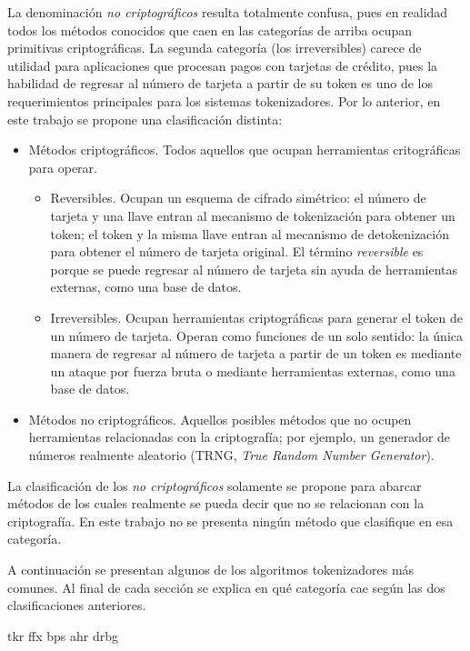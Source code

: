
La denominación \textit{no criptográficos} resulta totalmente confusa, pues en
realidad todos los métodos conocidos que caen en las categorías de arriba ocupan
primitivas criptográficas. La segunda categoría (los irreversibles) carece de
utilidad para aplicaciones que procesan pagos con tarjetas de crédito, pues la
habilidad de regresar al número de tarjeta a partir de su token es uno de los
requerimientos principales para los sistemas tokenizadores. Por lo anterior, en
este trabajo se propone una clasificación distinta:

\begin{itemize}
  \item Métodos criptográficos. Todos aquellos que ocupan herramientas
    critográficas para operar.
    \begin{itemize}
      \item Reversibles. Ocupan un esquema de cifrado simétrico: el número
        de tarjeta y una llave entran al mecanismo de tokenización para obtener
        un token; el token y la misma llave entran al mecanismo de
        detokenización para obtener el número de tarjeta original. El término
        \textit{reversible} es porque se puede regresar al número de tarjeta sin
        ayuda de herramientas externas, como una base de datos.
      \item Irreversibles. Ocupan herramientas criptográficas para generar el
        token de un número de tarjeta. Operan como funciones de un solo sentido:
        la única manera de regresar al número de tarjeta a partir de un token es
        mediante un ataque por fuerza bruta o mediante herramientas externas,
        como una base de datos.
    \end{itemize}
  \item Métodos no criptográficos. Aquellos posibles métodos que no ocupen
    herramientas relacionadas con la criptografía; por ejemplo, un generador de
    números realmente aleatorio (TRNG, \textit{True Random Number Generator}).
\end{itemize}

La clasificación de los \textit{no criptográficos} solamente se propone para
abarcar métodos de los cuales realmente se pueda decir que no se relacionan con
la criptografía. En este trabajo no se presenta ningún método que clasifique en
esa categoría.

A continuación se presentan algunos de los algoritmos tokenizadores más comunes.
Al final de cada sección se explica en qué categoría cae según las dos
clasificaciones anteriores.

{tkr}
{ffx}
{bps}
{ahr}
{drbg}

